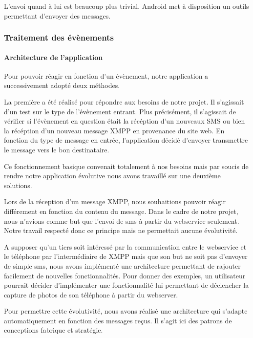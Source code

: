 L'envoi quand à lui est beaucoup plus trivial. Android met à disposition un outils permettant d'envoyer
des messages.


\subsubsection{Traitement des évènements}



\paragraph{Architecture de l'application}

Pour pouvoir réagir en fonction d'un évènement, notre application a successivement adopté deux méthodes.

La première a été réalisé pour répondre aux besoins de notre projet. Il s'agissait d'un test sur le 
type de l'évènement entrant. Plus précisément, il s'agissait de vérifier si l'évènement en question 
était la récéption d'un nouveaux SMS ou bien la récéption d'un nouveau message XMPP en provenance du 
site web. En fonction du type de message en entrée, l'application décidé d'envoyer transmettre le message
vers le bon destinataire. 

Ce fonctionnement basique convenait totalement à nos besoins mais par soucis de rendre notre application
évolutive nous avons travaillé sur une deuxième solutions.

Lors de la réception d'un message XMPP, nous souhaitions pouvoir réagir différement en fonction du contenu
du message. Dans le cadre de notre projet, nous n'avions comme but que l'envoi de sms à partir du webservice
seulement. Notre travail respecté donc ce principe mais ne permettait aucune évolutivité.

A supposer qu'un tiers soit intéressé par la communication entre le webservice et le téléphone par 
l'intermédiaire de XMPP mais que son but ne soit pas d'envoyer de simple sms, nous avons implémenté une
architecture permettant de rajouter facilement de nouvelles fonctionnalités. Pour donner des exemples, 
un utilisateur pourrait décider d'implémenter une fonctionnalité lui permettant de déclencher la capture
de photos de son téléphone à partir du webserver.

Pour permettre cette évolutivité, nous avons réalisé une architecture qui s'adapte automatiquement en
fonction des messages reçus. Il s'agit ici des patrons de conceptions fabrique et stratégie. 
\\


